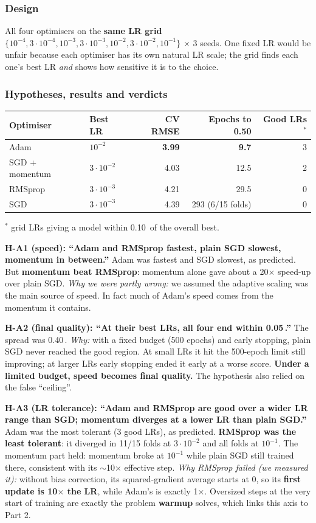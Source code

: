 \documentclass[11pt,a4paper]{article}
\newcommand{\A}{\,\text{\AA}}
\newcommand{\verdict}[1]{\fbox{\footnotesize\textbf{#1}}}
\begin{document}
\subsubsection*{Design}
All four optimisers on the \textbf{same LR grid} $\{10^{-4}, 3\cdot10^{-4}, 10^{-3}, 3\cdot10^{-3}, 10^{-2},
3\cdot10^{-2}, 10^{-1}\}$ $\times$ 3 seeds. One fixed LR would be unfair because each optimiser has its own natural LR
scale; the grid finds each one's best LR \emph{and} shows how sensitive it is to the choice.

\subsubsection*{Hypotheses, results and verdicts}
\begin{tabularx}{\linewidth}{@{}llrrr@{}}
\toprule
Optimiser & Best LR & CV RMSE & Epochs to 0.50 & Good LRs$^*$ \\
\midrule
Adam & $10^{-2}$ & \textbf{3.99} & \textbf{9.7} & 3 \\
SGD + momentum & $3\cdot10^{-2}$ & 4.03 & 12.5 & 2 \\
RMSprop & $3\cdot10^{-3}$ & 4.21 & 29.5 & 0 \\
SGD & $3\cdot10^{-3}$ & 4.39 & 293 (6/15 folds) & 0 \\
\bottomrule
\end{tabularx}
{\small $^*$ grid LRs giving a model within 0.10\A{} of the overall best.}

\textbf{H-A1 (speed): ``Adam and RMSprop fastest, plain SGD slowest, momentum in between.''} \verdict{Partly supported}
Adam was fastest and SGD slowest, as predicted. But \textbf{momentum beat RMSprop}: momentum alone gave about a 20$\times$
speed-up over plain SGD. \emph{Why we were partly wrong:} we assumed the adaptive scaling was the main source of speed. In
fact much of Adam's speed comes from the momentum it contains.

\textbf{H-A2 (final quality): ``At their best LRs, all four end within 0.05\A.''} \verdict{Contradicted}
The spread was 0.40\A. \emph{Why:} with a fixed budget (500 epochs) and early stopping, plain SGD never reached the good
region. At small LRs it hit the 500-epoch limit still improving; at larger LRs early stopping ended it early at a worse
score. \textbf{Under a limited budget, speed becomes final quality.} The hypothesis also relied on the false ``ceiling''.

\textbf{H-A3 (LR tolerance): ``Adam and RMSprop are good over a wider LR range than SGD; momentum diverges at a lower LR than
plain SGD.''} \verdict{Mixed}
Adam was the most tolerant (3 good LRs), as predicted. \textbf{RMSprop was the least tolerant}: it diverged in 11/15 folds at
$3\cdot10^{-2}$ and all folds at $10^{-1}$. The momentum part held: momentum broke at $10^{-1}$ while plain SGD still
trained there, consistent with its $\sim$10$\times$ effective step.
\emph{Why RMSprop failed (we measured it):} without bias correction, its squared-gradient average starts at 0, so its
\textbf{first update is 10$\times$ the LR}, while Adam's is exactly 1$\times$. Oversized steps at the very start of
training are exactly the problem \textbf{warmup} solves, which links this axis to Part 2.
\end{document}
